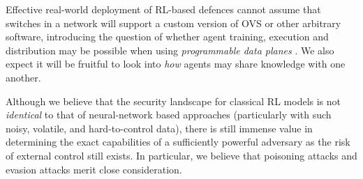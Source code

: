 \documentclass[10pt, times, comsoc]{IEEEtran}
\begin{document}
Effective real-world deployment of RL-based defences cannot assume that switches in a network will support a custom version of OVS or other arbitrary software, introducing the question of whether agent training, execution and distribution may be possible when using \emph{programmable data planes} \cite{DBLP:conf/ancs/JouetP17}.
We also expect it will be fruitful to look into \emph{how} agents may share knowledge with one another.

Although we believe that the security landscape for classical RL models is not \emph{identical} to that of neural-network based approaches (particularly with such noisy, volatile, and hard-to-control data), there is still immense value in determining the exact capabilities of a sufficiently powerful adversary as the risk of external control still exists.
In particular, we believe that poisoning attacks and evasion attacks merit close consideration.
\end{document}
